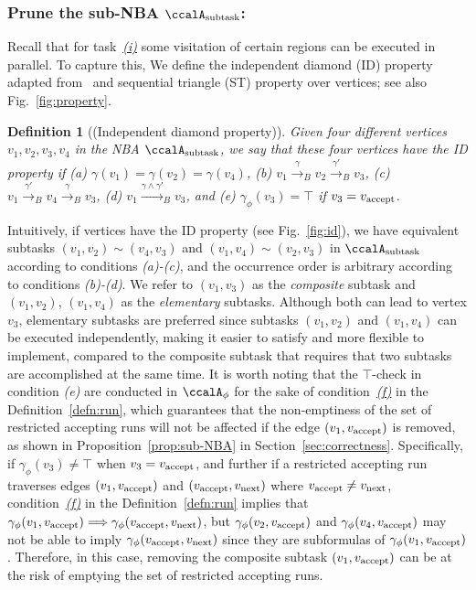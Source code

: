 \documentclass[Afour,sageh,times]{sagej}
\newtheorem{defn}[thm]{Definition}
\newcommand{\auto}[1]{\ccalA_{\textup{#1}}}
\newcommand{\autop}{\ccalA_{\phi}}
\newcommand{\vertex}[1]{v_{\textup{#1}}}
\newcommand{\simplies}{\DOTSB\Longrightarrow}
\begin{document}
  \subsubsection{Prune the sub-NBA \upshape $\auto{subtask}$:} \label{sub-NBA:2}
Recall that for task~\hyperref[task:i]{\it (i)}  some visitation of certain regions can be executed in parallel. To capture this, We define the independent diamond (ID) property adapted from~\cite{stefanescu2006automatic}  and sequential triangle (ST) property over vertices; see also Fig.~\ref{fig:property}.
\begin{defn}[(Independent diamond property)]\label{defn:id}
   Given four different vertices $v_1, v_2, v_3, v_4$ in the NBA $\auto{subtask}$, we say that these four vertices have the ID property if (a) $\gamma(v_1) = \gamma(v_2) = \gamma(v_4)$, (b) $v_1 \xrightarrow{\gamma}_B v_2 \xrightarrow{\gamma'}_B v_3$, (c) $v_1 \xrightarrow{\gamma'}_B v_4 \xrightarrow{\gamma}_B v_3$,  (d) $v_1 \xrightarrow{\gamma \wedge \gamma'}_B v_3$, and (e) $\gamma_{\phi}(v_3) = \top$ if $v_3 = \vertex{accept}$.
\end{defn}
Intuitively, if vertices have the ID property (see Fig.~\ref{fig:id}), we have equivalent subtasks $(v_1, v_2) \sim (v_4, v_3)$ and $(v_1, v_4) \sim (v_2, v_3)$ in $\auto{subtask}$ according to conditions {\it (a)-(c)}, and the occurrence order is arbitrary according to conditions {\it (b)-(d)}.  We refer to $(v_1, v_3)$ as the {\it composite} subtask and $(v_1, v_2)$, $(v_1, v_4)$ as the {\it elementary} subtasks.  Although both can lead to vertex $v_3$, elementary subtasks are preferred since subtasks $(v_1, v_2)$ and $(v_1, v_4)$ can be executed independently, making it easier to satisfy and more flexible to implement, compared to the composite subtask that requires that two subtasks are accomplished at the same time. It is worth noting that the $\top$-check in condition {\it (e)} are conducted in $\autop$ for the sake of condition~\hyperref[cond:f]{\it (f)} in the Definition~\ref{defn:run}, which guarantees that the non-emptiness of the set of restricted accepting runs will not be affected if the edge $(v_1, \vertex{accept})$ is removed,  as shown in Proposition~\ref{prop:sub-NBA} in Section~\ref{sec:correctness}. Specifically, if $\gamma_{\phi}(v_3) \ne \top$ when $v_3 = \vertex{accept}$, and further if a restricted accepting run traverses edges $(v_1, \vertex{accept})$ and $(\vertex{accept}, \vertex{next})$ where $\vertex{accept}\neq \vertex{next}$, condition~\hyperref[cond:f]{\it (f)} in the Definition~\ref{defn:run} implies  that $\gamma_{\phi}(v_1, \vertex{accept}) \simplies \gamma_{\phi}(\vertex{accept}, \vertex{next})$, but $\gamma_{\phi}(v_2, \vertex{accept})$ and $\gamma_{\phi}(v_4, \vertex{accept})$ may not be able to imply $\gamma_{\phi}(\vertex{accept}, \vertex{next})$ since they are subformulas of $\gamma_{\phi}(v_1, \vertex{accept})$. Therefore, in this case, removing the composite subtask $(v_1, \vertex{accept})$ can be at the risk of emptying the  set of restricted accepting runs.
\end{document}
